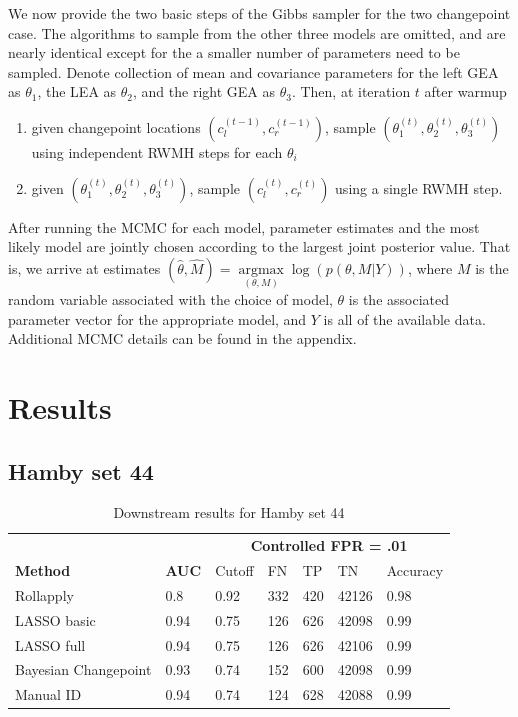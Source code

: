 \documentclass[12pt]{article}
\providecommand{\tightlist}{%
  \setlength{\itemsep}{0pt}\setlength{\parskip}{0pt}}
\begin{document}
We now provide the two basic steps of the Gibbs sampler for the two
changepoint case. The algorithms to sample from the other three models
are omitted, and are nearly identical except for the a smaller number of
parameters need to be sampled. Denote collection of mean and covariance
parameters for the left GEA as \(\theta_1\), the LEA as \(\theta_2\),
and the right GEA as \(\theta_3\). Then, at iteration \(t\) after warmup

\begin{enumerate}
\def\labelenumi{\arabic{enumi}.}
\tightlist
\item
  given changepoint locations \((c_l^{(t - 1)}, c_r^{(t - 1)})\), sample
  \((\theta_1^{(t)}, \theta_2^{(t)}, \theta_3^{(t)})\) using independent
  RWMH steps for each \(\theta_i\)\\
\item
  given \((\theta_1^{(t)}, \theta_2^{(t)}, \theta_3^{(t)})\), sample
  \((c_l^{(t)}, c_r^{(t)})\) using a single RWMH step.
\end{enumerate}

After running the MCMC for each model, parameter estimates and the most
likely model are jointly chosen according to the largest joint posterior
value. That is, we arrive at estimates
\((\hat{\theta}, \hat{M}) = \underset{(\theta, M)}{\operatorname{argmax}}{\log(p(\theta, M | Y))}\),
where \(M\) is the random variable associated with the choice of model,
\(\theta\) is the associated parameter vector for the appropriate model,
and \(Y\) is all of the available data. Additional MCMC details can be
found in the appendix.

\section{Results}

\subsection{Hamby set 44}

\begin{table}[]
\centering
\caption{Downstream results for Hamby set 44}
\begin{tabular}{lllllll}
& & \multicolumn{5}{c}{\textbf{Controlled FPR = .01}}\\
\textbf{Method} & \textbf{AUC} & Cutoff & FN &TP & TN & Accuracy \\ \hline
Rollapply & 0.8 &  0.92 & 332 & 420&42126 & 0.98 \\ \hline
LASSO basic & 0.94 &  0.75 &126 & 626&42098 & 0.99\\ \hline
LASSO full & 0.94 &  0.75 &126 &626 &42106 & 0.99 \\ \hline
Bayesian Changepoint & 0.93 &  0.74 &152 & 600&42098 & 0.99\\ \hline
Manual ID & 0.94 &  0.74 & 124& 628&42088 & 0.99\\ \hline 
\end{tabular}
\end{table}
\end{document}
